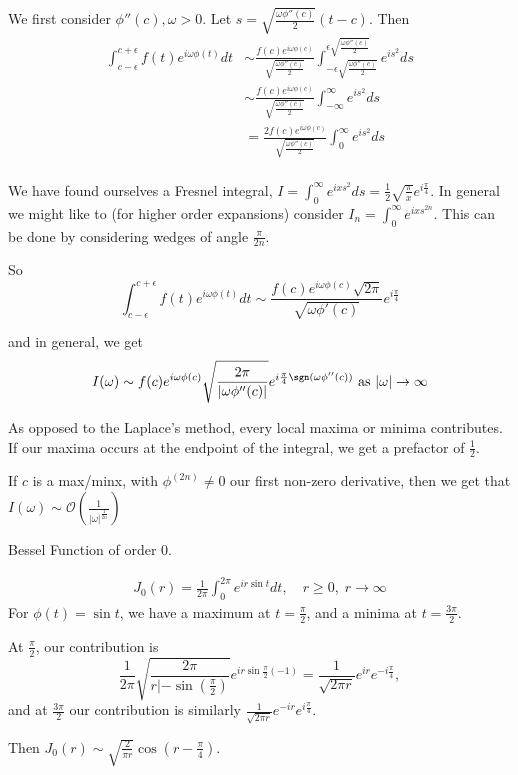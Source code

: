 \documentclass[a4paper]{article}
\begin{document}
We first consider $\phi''(c), \omega > 0$. Let  $s = \sqrt{\frac{\omega \phi''(c)}{2}}(t-c)$. Then
\begin{align*}
	\int_{c-\epsilon}^{c+\epsilon} f(t)e^{i\omega \phi(t)} dt &\sim \frac{f(c) e^{i\omega\phi(c)}}{\sqrt{\frac{\omega \phi''(c)}{2}}} \int_{-\epsilon \sqrt{\frac{\omega \phi''(c)}{2}} }^{\epsilon \sqrt{\frac{\omega \phi''(c)}{2}}} e^{is^2} ds \\
	&\sim \frac{f(c) e^{i\omega\phi(c)}}{\sqrt{\frac{\omega \phi''(c)}{2}}} \int_{-\infty}^{\infty} e^{is^2} ds \\
	&= \frac{2 f(c) e^{i\omega\phi(c)}}{\sqrt{\frac{\omega \phi''(c)}{2}}} \int_{0}^{\infty} e^{is^2} ds  \\
\end{align*}

We have found ourselves a Fresnel integral, $I = \int_{0}^{\infty} e^{ix s^2} ds = \frac{1}{2 }\sqrt{\frac{\pi}{x}} e^{i\frac{\pi}{4}} $. In general we might like to (for higher order expansions) consider $I_n = \int_{0}^{\infty} e^{ixs^{2n}}$. This can be done by considering wedges of angle $\frac{\pi}{2n}$.

So \[
	\int_{c-\epsilon}^{c+\epsilon} f(t) e^{i\omega \phi(t)} dt \sim \frac{f(c) e^{i\omega\phi(c)}\sqrt{2\pi} }{\sqrt{\omega \phi'(c)} } e^{i\frac{\pi}{4}}
\]

and in general, we get\[
	I(\omega) \sim f(c) e^{i\omega\phi(c)}\sqrt{\frac{2\pi}{|\omega \phi''(c)|}} e^{i\frac{\pi}{4} \sgn(\omega \phi''(c))} \text{ as } |\omega| \to \infty 
\]

As opposed to the Laplace's method, every local maxima or minima contributes. If our maxima occurs at the endpoint of the integral, we get a prefactor of $\frac{1}{2}$.

\begin{remark}
	If $c$ is a max/minx, with $\phi^{(2n)}\neq 0$ our first non-zero derivative, then we get that $I(\omega) \sim \mathcal{O}\left(\frac{1}{|\omega|^{\frac{1}{2n}}}  \right) $ 
\end{remark}

\begin{eg} Bessel Function of order $0$.

	\begin{align*}
		J_0(r) = \frac{1}{2\pi} \int_{0}^{2\pi} e^{ir \sin t} dt, \quad r\ge 0, \; r\to \infty
	\end{align*}
	For $\phi(t) = \sin t$, we have a maximum at $t = \frac{\pi}{2}$, and a minima at $t=\frac{3\pi}{2}$.

	At $\frac{\pi}{2}$, our contribution is
	\[
		\frac{1}{2\pi} \sqrt{\frac{2\pi}{r|-\sin(\frac{\pi}{2})}} e^{ir \sin \frac{\pi}{2} (-1)} = \frac{1}{\sqrt{2\pi r} } e^{ir} e^{-i\frac{\pi}{4}}
	,\]  and at $\frac{3\pi}{2}$ our contribution is similarly $\frac{1}{\sqrt{2\pi r} } e^{-ir} e^{i\frac{\pi}{4}}$.

	Then $J_0(r) \sim \sqrt{\frac{2}{\pi r}} \cos\left( r - \frac{\pi}{4} \right)  $.
\end{eg}
\end{document}
